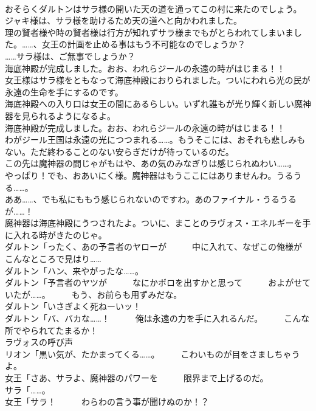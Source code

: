 \documentclass[8pt]{extreport}
\begin{document}
\begin{CJK}{UTF8}{min}
\\	おそらくダルトンはサラ様の開いた天の道を通ってこの村に来たのでしょう。	
\\	ジャキ様は、サラ様を助けるため天の道へと向かわれました。	
\\	理の賢者様や時の賢者様は行方が知れずサラ様までもがとらわれてしまいました。……、女王の計画を止める事はもう不可能なのでしょうか？	
\\	……サラ様は、ご無事でしょうか？	
\\	海底神殿が完成しました。おお、われらジールの永遠の時がはじまる！！	
\\	女王様はサラ様をともなって海底神殿におりられました。ついにわれら光の民が永遠の生命を手にするのです。	
\\	海底神殿への入り口は女王の間にあるらしい。いずれ誰もが光り輝く新しい魔神器を見られるようになるよ。	
\\	海底神殿が完成しました。おお、われらジールの永遠の時がはじまる！！	
\\	わがジール王国は永遠の光につつまれる……。もうそこには、おそれも悲しみもない。ただ終わることのない安らぎだけが待っているのだ。	
\\	この先は魔神器の間じゃがもはや、あの気のみなぎりは感じられぬわい……。	
\\	やっぱり！でも、おあいにく様。魔神器はもうここにはありませんわ。うるうる……。	
\\	ああ……、でも私にももう感じられないのですわ。あのファイナル・うるうるが……！	
\\	魔神器は海底神殿にうつされたよ。ついに、まことのラヴォス・エネルギーを手に入れる時がきたのじゃ。	
\\	ダルトン「ったく、あの予言者のヤローが　　　中に入れて、なぜこの俺様が　　　こんなところで見はり……	
\\	ダルトン「ハン、来やがったな……。	
\\	ダルトン「予言者のヤツが　　　なにかボロを出すかと思って　　　およがせていたが……。　　　もう、お前らも用ずみだな。	
\\	ダルトン「いさぎよく死ねーいッ！	
\\	ダルトン「バ、バカな……！　　　俺は永遠の力を手に入れるんだ。　　　こんな所でやられてたまるか！	
\\	ラヴォスの呼び声	
\\	リオン「黒い気が、たかまってくる……。　　　こわいものが目をさましちゃうよ。	
\\	女王「さあ、サラよ、魔神器のパワーを　　　限界まで上げるのだ。	
\\	サラ「……。	
\\	女王「サラ！　　　わらわの言う事が聞けぬのか！？	

\end{CJK}
\end{document}

